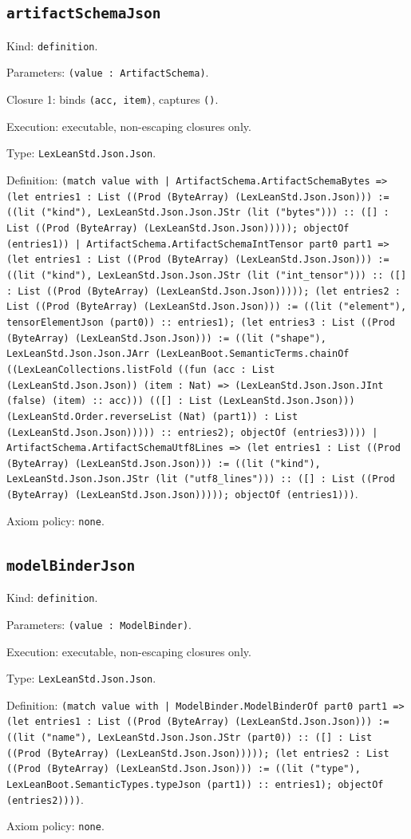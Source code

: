 \documentclass[11pt]{article}
\begin{document}
\subsection*{\texttt{artifactSchemaJson}}
\noindent Kind: \texttt{definition}.\par
\noindent Parameters: \texttt{(value : ArtifactSchema)}.\par
\noindent Closure 1: binds \texttt{(acc, item)}, captures \texttt{()}.\par
\noindent Execution: executable, non-escaping closures only.\par
\noindent Type: \texttt{LexLeanStd.Json.Json}.\par
\noindent Definition: \texttt{(match value with | ArtifactSchema.ArtifactSchemaBytes => (let entries1 : List ((Prod (ByteArray) (LexLeanStd.Json.Json))) := ((lit ("kind"), LexLeanStd.Json.Json.JStr (lit ("bytes"))) :: ([] : List ((Prod (ByteArray) (LexLeanStd.Json.Json))))); objectOf (entries1)) | ArtifactSchema.ArtifactSchemaIntTensor part0 part1 => (let entries1 : List ((Prod (ByteArray) (LexLeanStd.Json.Json))) := ((lit ("kind"), LexLeanStd.Json.Json.JStr (lit ("int\_tensor"))) :: ([] : List ((Prod (ByteArray) (LexLeanStd.Json.Json))))); (let entries2 : List ((Prod (ByteArray) (LexLeanStd.Json.Json))) := ((lit ("element"), tensorElementJson (part0)) :: entries1); (let entries3 : List ((Prod (ByteArray) (LexLeanStd.Json.Json))) := ((lit ("shape"), LexLeanStd.Json.Json.JArr (LexLeanBoot.SemanticTerms.chainOf ((LexLeanCollections.listFold ((fun (acc : List (LexLeanStd.Json.Json)) (item : Nat) => (LexLeanStd.Json.Json.JInt (false) (item) :: acc))) (([] : List (LexLeanStd.Json.Json))) (LexLeanStd.Order.reverseList (Nat) (part1)) : List (LexLeanStd.Json.Json))))) :: entries2); objectOf (entries3)))) | ArtifactSchema.ArtifactSchemaUtf8Lines => (let entries1 : List ((Prod (ByteArray) (LexLeanStd.Json.Json))) := ((lit ("kind"), LexLeanStd.Json.Json.JStr (lit ("utf8\_lines"))) :: ([] : List ((Prod (ByteArray) (LexLeanStd.Json.Json))))); objectOf (entries1)))}.\par
\noindent Axiom policy: \texttt{none}.\par
\subsection*{\texttt{modelBinderJson}}
\noindent Kind: \texttt{definition}.\par
\noindent Parameters: \texttt{(value : ModelBinder)}.\par
\noindent Execution: executable, non-escaping closures only.\par
\noindent Type: \texttt{LexLeanStd.Json.Json}.\par
\noindent Definition: \texttt{(match value with | ModelBinder.ModelBinderOf part0 part1 => (let entries1 : List ((Prod (ByteArray) (LexLeanStd.Json.Json))) := ((lit ("name"), LexLeanStd.Json.Json.JStr (part0)) :: ([] : List ((Prod (ByteArray) (LexLeanStd.Json.Json))))); (let entries2 : List ((Prod (ByteArray) (LexLeanStd.Json.Json))) := ((lit ("type"), LexLeanBoot.SemanticTypes.typeJson (part1)) :: entries1); objectOf (entries2))))}.\par
\noindent Axiom policy: \texttt{none}.\par
\end{document}
